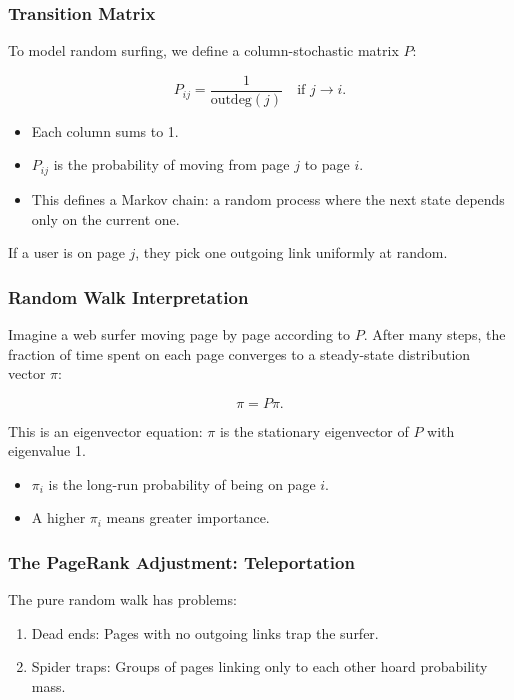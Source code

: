 \documentclass[
  letterpaper,
  DIV=11,
  numbers=noendperiod]{scrreprt}
\providecommand{\tightlist}{%
  \setlength{\itemsep}{0pt}\setlength{\parskip}{0pt}}
\begin{document}
\subsubsection{Transition Matrix}\label{transition-matrix}

To model random surfing, we define a column-stochastic matrix \(P\):

\[
P_{ij} = \frac{1}{\text{outdeg}(j)} \quad \text{if \(j \to i\)}.
\]

\begin{itemize}
\tightlist
\item
  Each column sums to 1.
\item
  \(P_{ij}\) is the probability of moving from page \(j\) to page \(i\).
\item
  This defines a Markov chain: a random process where the next state
  depends only on the current one.
\end{itemize}

If a user is on page \(j\), they pick one outgoing link uniformly at
random.

\subsubsection{Random Walk
Interpretation}\label{random-walk-interpretation}

Imagine a web surfer moving page by page according to \(P\). After many
steps, the fraction of time spent on each page converges to a
steady-state distribution vector \(\pi\):

\[
\pi = P \pi.
\]

This is an eigenvector equation: \(\pi\) is the stationary eigenvector
of \(P\) with eigenvalue 1.

\begin{itemize}
\tightlist
\item
  \(\pi_i\) is the long-run probability of being on page \(i\).
\item
  A higher \(\pi_i\) means greater importance.
\end{itemize}

\subsubsection{The PageRank Adjustment:
Teleportation}\label{the-pagerank-adjustment-teleportation}

The pure random walk has problems:

\begin{enumerate}
\def\labelenumi{\arabic{enumi}.}
\tightlist
\item
  Dead ends: Pages with no outgoing links trap the surfer.
\item
  Spider traps: Groups of pages linking only to each other hoard
  probability mass.
\end{enumerate}
\end{document}
